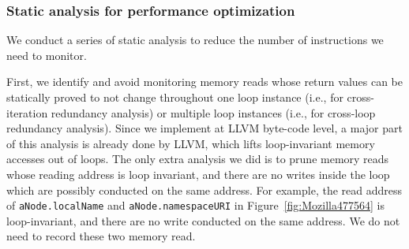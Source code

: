 



\subsubsection{Static analysis for performance optimization}
\label{sec:perf}

We conduct a series of static analysis to reduce the number of instructions we 
need to monitor. 

First, we identify and avoid monitoring memory reads whose return values can be 
statically proved to
not change throughout one loop instance (i.e., for cross-iteration
redundancy analysis) or multiple loop instances (i.e., for cross-loop redundancy
analysis). Since we implement \Tool at LLVM byte-code level, a major part of this
analysis is already done by LLVM, which lifts loop-invariant memory
accesses out of loops. The only extra analysis we did is to 
prune memory reads whose reading address is loop invariant, and there are no writes 
inside the loop which are possibly conducted on the same address. 
For example, the read address of \texttt{aNode.localName} and \texttt{aNode.namespaceURI}
in Figure~\ref{fig:Mozilla477564} is loop-invariant, and there are no write conducted 
on the same address. We do not need to record these two memory read. 

